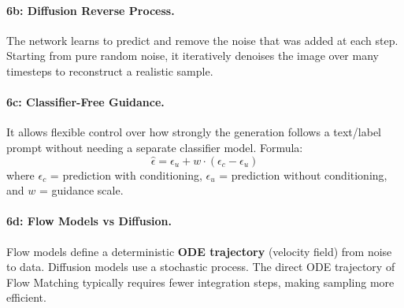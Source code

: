 \documentclass[11pt]{article}
\begin{document}
\paragraph{6b: Diffusion Reverse Process.} The network learns to predict and remove the noise that was added at each step. Starting from pure random noise, it iteratively denoises the image over many timesteps to reconstruct a realistic sample.

\paragraph{6c: Classifier-Free Guidance.} It allows flexible control over how strongly the generation follows a text/label prompt without needing a separate classifier model. Formula:
$$ \hat{\epsilon} = \epsilon_u + w \cdot (\epsilon_c - \epsilon_u) $$
where $\epsilon_c$ = prediction with conditioning, $\epsilon_u$ = prediction without conditioning, and $w$ = guidance scale.

\paragraph{6d: Flow Models vs Diffusion.} Flow models define a deterministic \textbf{ODE trajectory} (velocity field) from noise to data. Diffusion models use a stochastic process. The direct ODE trajectory of Flow Matching typically requires fewer integration steps, making sampling more efficient.
\end{document}
